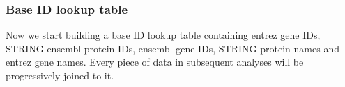 \begin{table}[H]
\centering
{}
\end{table}

\hypertarget{base-id-lookup-table}{%
\subsubsection{Base ID lookup table}\label{base-id-lookup-table}}

Now we start building a base ID lookup table containing entrez gene IDs,
STRING ensembl protein IDs, ensembl gene IDs, STRING protein names and
entrez gene names. Every piece of data in subsequent analyses will be
progressively joined to it.

